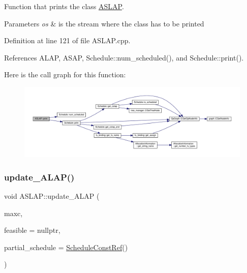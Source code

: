 Function that prints the class \hyperlink{classASLAP}{A\+S\+L\+AP}. 


\begin{DoxyParams}{Parameters}
{\em os} & is the stream where the class has to be printed \\
\hline
\end{DoxyParams}


Definition at line 121 of file A\+S\+L\+A\+P.\+cpp.



References A\+L\+AP, A\+S\+AP, Schedule\+::num\+\_\+scheduled(), and Schedule\+::print().

Here is the call graph for this function\+:
\nopagebreak
\begin{figure}[H]
\begin{center}
\leavevmode
\includegraphics[width=350pt]{d9/d2a/classASLAP_a19d19a74b5b0d8d0aec0107b4b1cc656_cgraph}
\end{center}
\end{figure}
\mbox{\label{classASLAP_af2b9d79b6200a5a8d53b9480cd87125e}} 
\subsubsection{\texorpdfstring{update\+\_\+\+A\+L\+A\+P()}{update\_ALAP()}}
{\footnotesize\ttfamily void A\+S\+L\+A\+P\+::update\+\_\+\+A\+L\+AP (\begin{DoxyParamCaption}\item[{const Control\+Step}]{maxc,  }\item[{bool $\ast$}]{feasible = {\ttfamily nullptr},  }\item[{const \hyperlink{schedule_8hpp_a85e4dea8a1611026193d8ca13fc5a260}{Schedule\+Const\+Ref}}]{partial\+\_\+schedule = {\ttfamily \hyperlink{schedule_8hpp_a85e4dea8a1611026193d8ca13fc5a260}{Schedule\+Const\+Ref}()} }\end{DoxyParamCaption})}



